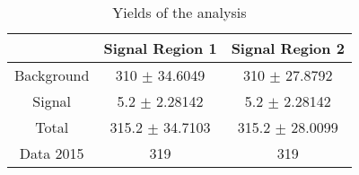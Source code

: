 \documentclass[10pt]{article}
\begin{document}
\begin{table}[htbp]
\begin{center}
\begin{tabular}{|c|c|c|}
\hline 
 & Signal Region 1 & Signal Region 2\\
\hline 
  Background   & \num[round-mode=figures,round-precision=3]{310} $\pm$ \num[round-mode=figures,round-precision=3]{34.6049} & \num[round-mode=figures,round-precision=3]{310} $\pm$ \num[round-mode=figures,round-precision=3]{27.8792} \\ 
  Signal   & \num[round-mode=figures,round-precision=3]{5.2} $\pm$ \num[round-mode=figures,round-precision=3]{2.28142} & \num[round-mode=figures,round-precision=3]{5.2} $\pm$ \num[round-mode=figures,round-precision=3]{2.28142} \\ 
\hline 
  Total  & \num[round-mode=figures,round-precision=3]{315.2} $\pm$ \num[round-mode=figures,round-precision=3]{34.7103} & \num[round-mode=figures,round-precision=3]{315.2} $\pm$ \num[round-mode=figures,round-precision=3]{28.0099} \\ 
\hline 
  Data 2015   & 319 & 319 \\ 
\hline 
\end{tabular} 
\caption{Yields of the analysis} 
\end{center} 
\end{table} 
\end{document}
